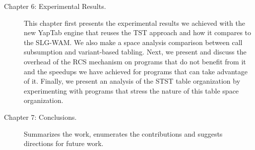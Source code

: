 \begin{description}
   \item[Chapter 6: Experimental Results.] This chapter first presents the experimental results we achieved with
   the new YapTab engine that reuses the TST approach and how it compares to the SLG-WAM. We also make a space
   analysis comparison between call subsumption and variant-based tabling.
   Next, we present and discuss the overhead of the RCS mechanism on programs that do not benefit from it and
   the speedups we have achieved for programs that can take advantage of it. Finally, we present an analysis of
   the STST table organization by experimenting with programs that stress the nature of this table space organization.
   
   \item[Chapter 7: Conclusions.] Summarizes the work, enumerates the contributions and suggests directions for
   future work.
   
\end{description}
